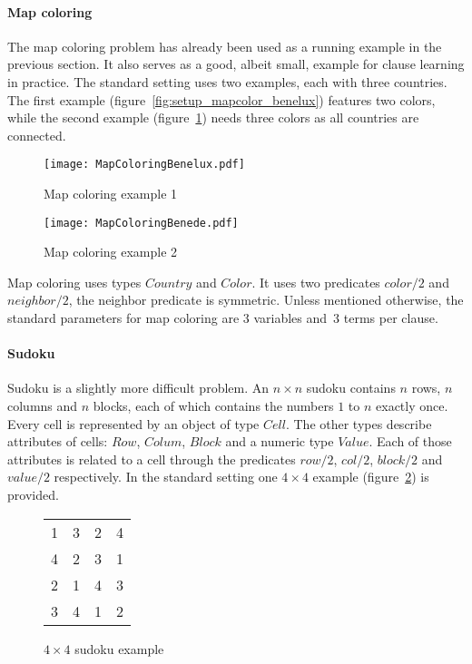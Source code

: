 \paragraph{Map coloring}
The map coloring problem has already been used as a running example in the previous section.
It also serves as a good, albeit small, example for clause learning in practice.
The standard setting uses two examples, each with three countries.
The first example (figure~\ref{fig:setup_mapcolor_benelux}) features two colors, while the second example (figure~\ref{fig:setup_mapcolor_benede}) needs three colors as all countries are connected.

\begin{figure}
\centering
\begin{minipage}{.5\textwidth}
  \centering
  \texttt{[image: MapColoringBenelux.pdf]}
  \caption{Map coloring example 1}
  \label{fig:setup_mapcolor_benelux}
\end{minipage}%
\begin{minipage}{.5\textwidth}
  \centering
  \texttt{[image: MapColoringBenede.pdf]}
  \caption{Map coloring example 2}
  \label{fig:setup_mapcolor_benede}
\end{minipage}
\end{figure}

Map coloring uses types $\mathit{Country}$ and $\mathit{Color}$.
It uses two predicates $\mathit{color/2}$ and $\mathit{neighbor/2}$, the neighbor predicate is symmetric.
Unless mentioned otherwise, the standard parameters for map coloring are $3$ variables and~$3$ terms per clause.

\paragraph{Sudoku}
Sudoku is a slightly more difficult problem.
An $n \times n$ sudoku contains $n$ rows, $n$ columns and $n$ blocks, each of which contains the numbers $1$ to $n$ exactly once.
Every cell is represented by an object of type $\mathit{Cell}$.
The other types describe attributes of cells: $\mathit{Row}$, $\mathit{Colum}$, $\mathit{Block}$ and a numeric type $\mathit{Value}$.
Each of those attributes is related to a cell through the predicates $\mathit{row/2}$, $\mathit{col/2}$, $\mathit{block/2}$ and $\mathit{value/2}$ respectively.
In the standard setting one $4 \times 4$ example (figure~\ref{fig:setup_sudoku}) is provided.

\begin{figure}[!htp]
	\centering
	\begin{tabular}{|cc|cc|}
		\hline
		1 & 3 & 2 & 4 \\
		4 & 2 & 3 & 1 \\ \hline
		2 & 1 & 4 & 3 \\
		3 & 4 & 1 & 2 \\ \hline
	\end{tabular}
	\label{fig:setup_sudoku}
	\caption{$4 \times 4$ sudoku example}
\end{figure}

